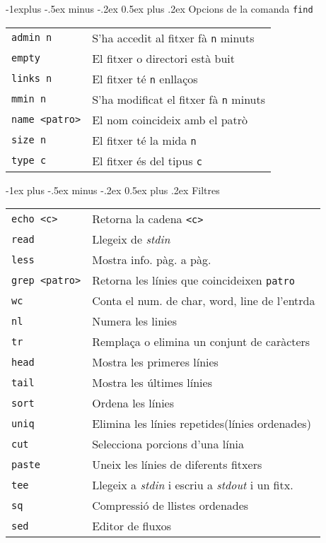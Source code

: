 \documentclass[10pt,landscape]{article}
\makeatletter
\renewcommand{\section}{\@startsection{section}{1}{0mm}%
                                {-1ex plus -.5ex minus -.2ex}%
                                {0.5ex plus .2ex}%
                                {\normalfont\large\bfseries}}
\renewcommand{\subsection}{\@startsection{subsection}{2}{0mm}%
                                {-1explus -.5ex minus -.2ex}%
                                {0.5ex plus .2ex}%
                                {\normalfont\normalsize\bfseries}}
\makeatother
\begin{document}
\begin{multicols}{3}
\subsection{Opcions de la comanda \texttt{find}}
\begin{tabular}{@{}ll@{}}
  \verb!admin n! & S'ha accedit al fitxer fà \verb!n! minuts\\
  \verb!empty!  & El fitxer o directori està buit\\
  \verb!links n! & El fitxer té \verb!n! enllaços\\
  \verb!mmin n! & S'ha modificat el fitxer fà \verb!n! minuts\\
  \verb!name <patro>! & El nom coincideix amb el patrò\\
  \verb!size n! & El fitxer té la mida \verb!n!\\
  \verb!type c! & El fitxer és del tipus \verb!c!\\
\end{tabular}

\section{Filtres}
\begin{tabular}{@{}ll@{}}
  \verb!echo <c>! & Retorna la cadena \verb!<c>!\\
  \verb!read! & Llegeix de \textit{stdin}\\
  \verb!less! & Mostra info. pàg. a pàg.\\
  \verb!grep <patro>! & Retorna les línies que coincideixen \verb!patro!\\
  \verb!wc! & Conta el num. de char, word, line de l'entrda\\
  \verb!nl! & Numera les linies\\
  \verb!tr! & Remplaça o elimina un conjunt de caràcters\\
  \verb!head ! & Mostra les primeres línies\\
  \verb!tail ! & Mostra les últimes línies\\
  \verb!sort ! & Ordena les línies\\
  \verb!uniq! & Elimina les línies repetides(línies ordenades)\\
  \verb!cut! & Selecciona porcions d'una línia\\
  \verb!paste! & Uneix les línies de diferents fitxers\\
  \verb!tee! & Llegeix a \textit{stdin} i escriu a \textit{stdout} i un fitx.\\
  \verb!sq! & Compressió de llistes ordenades\\
  \verb!sed! & Editor de fluxos\\
\end{tabular}


\end{multicols}
\end{document}
